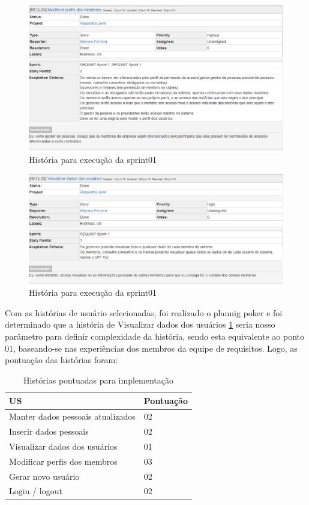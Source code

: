 \begin{figure}[H]
    \centering
    \includegraphics[keepaspectratio=true,scale=0.6]{figuras/us06.eps}
    \caption[História da sprint 01]{História para execução da sprint01}
\end{figure}
\begin{figure}[H]
    \centering
    \includegraphics[keepaspectratio=true,scale=0.6]{figuras/us07.eps}
    \caption[História da sprint 01]{História para execução da sprint01\label{usPontoUm}}
\end{figure}

Com as histórias de usuário selecionadas, foi realizado o plannig poker e foi determinado que a história de Visualizar dados dos usuários \ref{usPontoUm} seria nosso parâmetro para definir complexidade da história, sendo esta equivalente ao ponto 01, baseando-se nas experiências dos membros da equipe de requisitos. Logo, as pontuação das histórias foram: 

\begin{table}[H]
    \centering
    \label{historiasImplementar}
    \caption{Histórias pontuadas para implementação}
    \begin{tabular}{|l|l|}
        \hline
        US & Pontuação\\
        \hline
        Manter dados pessoais atualizados & 02\\
        \hline
        Inserir dados pessoais &  02\\
        \hline
        Visualizar dados dos usuários & 01\\
        \hline
        Modificar perfis dos membros & 03\\
        \hline
        Gerar novo usuário & 02\\
        \hline 
        Login / logout & 02\\
        \hline
    \end{tabular}
\end{table}

